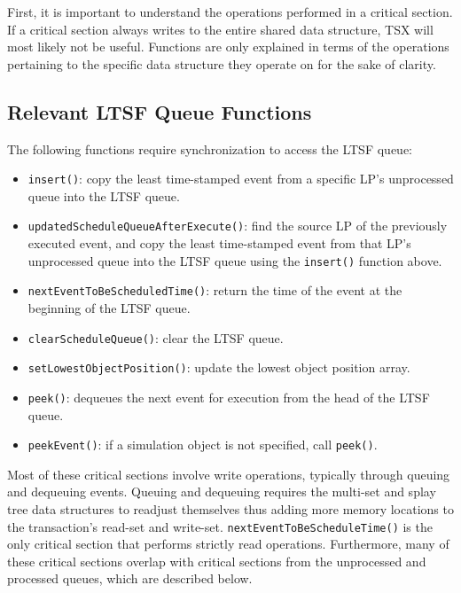 \documentclass[11pt]{book}
\begin{document}
First, it is important to understand the operations performed in a critical section.  If a
critical section always writes to the entire shared data structure, TSX will most likely
not be useful.  Functions are only explained in terms of the operations pertaining to the
specific data structure they operate on for the sake of clarity.

\subsection{Relevant LTSF Queue Functions}
\label{sec:ltsfq_functions}

The following functions require synchronization to access the LTSF queue:

\vspace*{-\bigskipamount}
\begin{singlespace}
\begin{itemize}
    \item\texttt{insert()}: copy the least time-stamped event from a specific
        LP's unprocessed queue into the LTSF queue.
  \item\texttt{updatedScheduleQueueAfterExecute()}: find the source LP of the
      previously executed event, and copy the least time-stamped event from that
      LP's unprocessed queue into the LTSF queue using the \texttt{insert()}
      function above.
  \item\texttt{nextEventToBeScheduledTime()}: return the time of the event at the
    beginning of the LTSF queue.
  \item\texttt{clearScheduleQueue()}: clear the LTSF queue.
  \item\texttt{setLowestObjectPosition()}: update the lowest object position
      array. 
  \item\texttt{peek()}: dequeues the next event for execution from the head of
      the LTSF queue.
  \item\texttt{peekEvent()}: if a simulation object is not specified, call \texttt{peek()}. 
  \end{itemize}
\end{singlespace}

Most of these critical sections involve write operations, typically through
queuing and dequeuing events.  Queuing and dequeuing requires the multi-set and
splay tree data structures to readjust themselves thus adding more memory
locations to the transaction's read-set and write-set.
\texttt{nextEventToBeScheduleTime()} is the only critical section that performs
strictly read operations.  Furthermore, many of these critical sections overlap
with critical sections from the unprocessed and processed queues, which are
described below.
\end{document}
